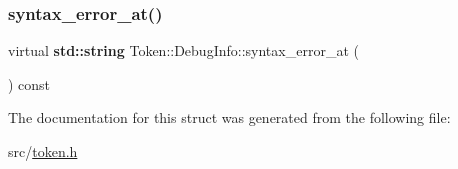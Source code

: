 \subsubsection{\texorpdfstring{syntax\+\_\+error\+\_\+at()}{syntax\_error\_at()}}
{\footnotesize\ttfamily virtual \textbf{ std\+::string} Token\+::\+Debug\+Info\+::syntax\+\_\+error\+\_\+at (\begin{DoxyParamCaption}{ }\end{DoxyParamCaption}) const\hspace{0.3cm}{\ttfamily [pure virtual]}}



The documentation for this struct was generated from the following file\+:\begin{DoxyCompactItemize}
\item 
src/\hyperlink{token_8h}{token.\+h}\end{DoxyCompactItemize}
